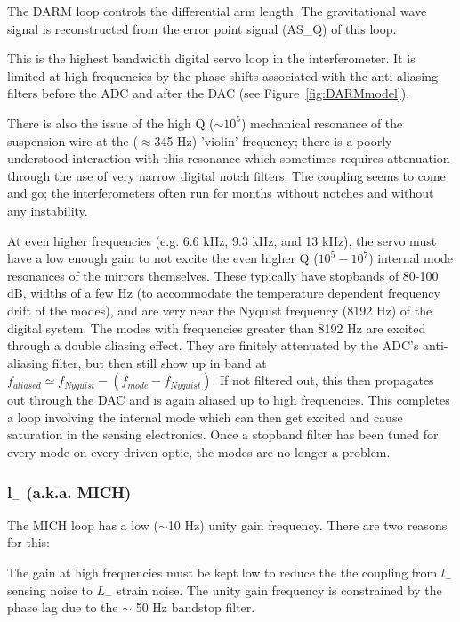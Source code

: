 The DARM loop controls the differential arm length. The gravitational wave
signal is reconstructed from the error point signal (AS\_Q) of this loop.

This is the highest bandwidth digital servo loop in the interferometer. It
is limited at high frequencies by the phase shifts associated with the
anti-aliasing filters before the ADC and after the DAC (see 
Figure~\ref{fig:DARMmodel}). 

There is also the issue of the high Q ($\sim 10^5$) mechanical
resonance of the suspension wire at the ($\approx$345 Hz) 'violin' frequency;
there is a poorly understood interaction with this resonance which sometimes
requires attenuation through the use of very narrow digital notch filters.
The coupling seems to come and go; the interferometers often run for months
without notches and without any instability.

At even higher frequencies (e.g. 6.6 kHz, 9.3 kHz, and 13 kHz), the servo must have a low 
enough gain to not excite the even higher Q ($10^5 - 10^7$) internal mode 
resonances of the mirrors themselves. These typically have stopbands of 
80-100 dB, widths of a few Hz (to accommodate the temperature dependent 
frequency drift of the modes), and are very near the Nyquist frequency (8192 Hz) 
of the digital system. The modes
with frequencies greater than 8192 Hz are excited through a double aliasing
effect. They are finitely attenuated by the ADC's anti-aliasing filter, but
then still show up in band at 
$f_{aliased} \simeq f_{Nyquist} - (f_{mode} - f_{Nyquist})$. If not filtered
out, this then propagates out through the DAC and is again aliased up to high
frequencies. This completes a loop involving the internal mode which can then
get excited and cause saturation in the sensing electronics. Once a stopband
filter has been tuned for every mode on every driven optic, the modes are
no longer a problem.


\subsubsection{l$_-$ (a.k.a. MICH)}

The MICH loop has a low ($\sim$10 Hz) unity gain frequency. There are two
reasons for this: 

The gain at high frequencies must be kept low to reduce the
the coupling from $l_-$ sensing noise to $L_-$ strain noise. The unity gain
frequency is constrained by the phase lag due to the $\sim$ 50 Hz bandstop filter.

